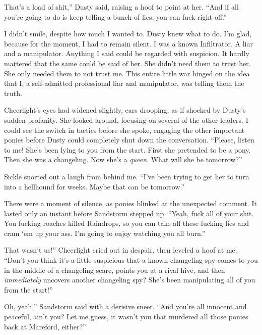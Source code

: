 \leavevmode{}That’s a load of shit,” Dusty said, raising a hoof to point at her. “And if all you’re going to do is keep telling a bunch of lies, you can fuck right off.”

I didn’t smile, despite how much I wanted to. Dusty knew what to do. I’m glad, because for the moment, I had to remain silent. I was a known Infiltrator. A liar and a manipulator. Anything I said could be regarded with suspicion. It hardly mattered that the same could be said of her. She didn’t need them to trust her. She only needed them to not trust me. This entire little war hinged on the idea that I, a self-admitted professional liar and manipulator, was telling them the truth.

Cheerlight’s eyes had widened slightly, ears drooping, as if shocked by Dusty’s sudden profanity. She looked around, focusing on several of the other leaders. I could see the switch in tactics before she spoke, engaging the other important ponies before Dusty could completely shut down the conversation. “Please, listen to me! She’s been lying to you from the start. First she pretended to be a pony. Then she was a changeling. Now she’s a \textit{queen}. What will she be tomorrow?”

Sickle snorted out a laugh from behind me. “I’ve been trying to get her to turn into a hellhound for weeks. Maybe that can be tomorrow.”

There were a moment of silence, as ponies blinked at the unexpected comment. It lasted only an instant before Sandstorm stepped up. “Yeah, fuck all of your shit. You fucking roaches killed Raindrops, so you can take all these fucking lies and cram ‘em up your ass. I’m going to enjoy watching you all burn.”

\leavevmode{}That wasn’t us!” Cheerlight cried out in despair, then leveled a hoof at me. “Don’t you think it’s a little suspicious that a known changeling spy comes to you in the middle of a changeling scare, points you at a rival hive, and then \textit{immediately} uncovers another changeling spy? She’s been manipulating all of you from the start!”

\leavevmode{}Oh, yeah,” Sandstorm said with a derisive sneer. “And you’re all innocent and peaceful, ain’t you? Let me guess, it wasn’t you that murdered all those ponies back at Mareford, either?”

